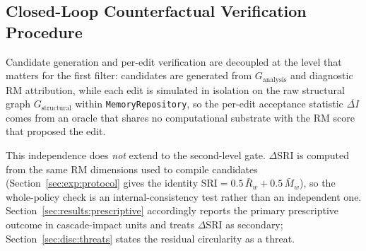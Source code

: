 \subsection{Closed-Loop Counterfactual Verification Procedure}
\label{sec:prescribe:verification}

Candidate generation and per-edit verification are decoupled at the level that matters for the first filter: candidates are generated from $G_{\text{analysis}}$ and diagnostic RM attribution, while each edit is simulated in isolation on the raw structural graph $G_{\text{structural}}$ within \texttt{MemoryRepository}, so the per-edit acceptance statistic $\overline{\Delta I}$ comes from an oracle that shares no computational substrate with the RM score that proposed the edit.

This independence does \emph{not} extend to the second-level gate. $\Delta\mathrm{SRI}$ is computed from the same RM dimensions used to compile candidates (Section~\ref{sec:exp:protocol} gives the identity $\mathrm{SRI} = 0.5\,\bar{R}_w + 0.5\,\bar{M}_w$), so the whole-policy check is an internal-consistency test rather than an independent one. Section~\ref{sec:results:prescriptive} accordingly reports the primary prescriptive outcome in cascade-impact units and treats $\Delta\mathrm{SRI}$ as secondary; Section~\ref{sec:disc:threats} states the residual circularity as a threat.
